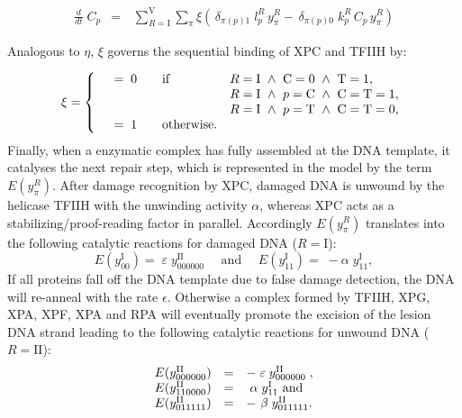 \begin{eqnarray}\label{Eqn:concentration}
\frac{d}{dt}\;C_p&=&\,\sum_{R=\text{I}}^{\text{V}} \sum_{\pi} \xi \left( \,\delta_{\pi (p)1}\;l_{p}^{ R}\, y_{\pi}^{R}- \,\delta_{\pi (p)0}\; k_{p}^{ R} \,C_p\,y_{\pi}^{R}\right)
\end{eqnarray}  

Analogous to $\eta$, $\xi$ governs the sequential binding of XPC and TFIIH by:

\begin{align*}
\xi =\left\{
\begin{array}{l l ll}
& =\; 0 \quad   &\text{if} & R=\text{I} ~\wedge~ \text{C}=0 ~\wedge~ \text{T}=1, \\
&    && R=\text{I} ~\wedge~ p=\text{C} ~\wedge~ \text{C}=\text{T}=1, \\
&    &&R=\text{I} ~\wedge~ p=\text{T} ~\wedge~ \text{C}=\text{T}=0, \\
& = \; 1 \quad& \text{otherwise}.&
\end{array}
\right.
\end{align*}
Finally, when a enzymatic complex has fully assembled at the DNA template, it catalyses the next repair step, which is represented in the model by the term $E(y_{\pi}^{R})$. After damage recognition by XPC, damaged DNA is unwound by the helicase TFIIH with the unwinding activity $\alpha$, whereas XPC acts as a stabilizing/proof-reading factor in parallel. Accordingly $E(y_{\pi}^{R})$ translates into the following catalytic reactions for damaged DNA ($R= \text{I}$):
$$E(y_{00}^\text{I})=\;\varepsilon\;y_{000000}^\text{II} \quad \text{ and }\quad
E(y_{11}^\text{I})=\;-\alpha \;y_{11}^\text{I},$$
If all proteins fall off the DNA template due to false damage detection, the DNA will re-anneal with the rate $\epsilon$. Otherwise a complex formed by TFIIH, XPG, XPA, XPF, XPA and RPA will eventually promote the excision of the lesion DNA strand leading to the following catalytic reactions for unwound DNA ($R= \text{II}$): 	
\begin{align*}
	\begin{array}{l l l}
		E(y_{000000}^\text{II})&=&-\;	\varepsilon	\;y_{000000}^\text{II}\;, \\ E(y_{110000}^\text{II})&=&\;	\alpha	\;y_{11}^\text{I} 	\text{ and }\\
	    E(y_{011111}^\text{II})&=&-\	\beta	\;y_{011111}^\text{II}.
	\end{array}
\end{align*}

